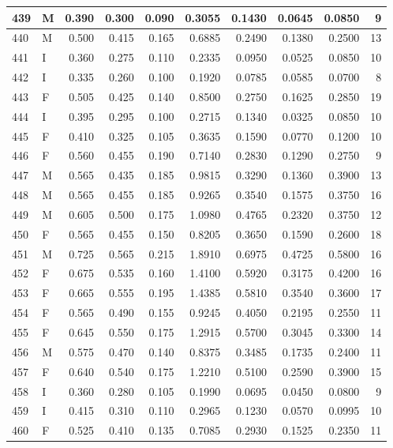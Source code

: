 \documentclass[9pt,twocolumn,twoside,]{pnas-new}
\begin{document}
\begin{tabular}{l|l|r|r|r|r|r|r|r|r}
\hline
439 & M & 0.390 & 0.300 & 0.090 & 0.3055 & 0.1430 & 0.0645 & 0.0850 & 9\\
\hline
440 & M & 0.500 & 0.415 & 0.165 & 0.6885 & 0.2490 & 0.1380 & 0.2500 & 13\\
\hline
441 & I & 0.360 & 0.275 & 0.110 & 0.2335 & 0.0950 & 0.0525 & 0.0850 & 10\\
\hline
442 & I & 0.335 & 0.260 & 0.100 & 0.1920 & 0.0785 & 0.0585 & 0.0700 & 8\\
\hline
443 & F & 0.505 & 0.425 & 0.140 & 0.8500 & 0.2750 & 0.1625 & 0.2850 & 19\\
\hline
444 & I & 0.395 & 0.295 & 0.100 & 0.2715 & 0.1340 & 0.0325 & 0.0850 & 10\\
\hline
445 & F & 0.410 & 0.325 & 0.105 & 0.3635 & 0.1590 & 0.0770 & 0.1200 & 10\\
\hline
446 & F & 0.560 & 0.455 & 0.190 & 0.7140 & 0.2830 & 0.1290 & 0.2750 & 9\\
\hline
447 & M & 0.565 & 0.435 & 0.185 & 0.9815 & 0.3290 & 0.1360 & 0.3900 & 13\\
\hline
448 & M & 0.565 & 0.455 & 0.185 & 0.9265 & 0.3540 & 0.1575 & 0.3750 & 16\\
\hline
449 & M & 0.605 & 0.500 & 0.175 & 1.0980 & 0.4765 & 0.2320 & 0.3750 & 12\\
\hline
450 & F & 0.565 & 0.455 & 0.150 & 0.8205 & 0.3650 & 0.1590 & 0.2600 & 18\\
\hline
451 & M & 0.725 & 0.565 & 0.215 & 1.8910 & 0.6975 & 0.4725 & 0.5800 & 16\\
\hline
452 & F & 0.675 & 0.535 & 0.160 & 1.4100 & 0.5920 & 0.3175 & 0.4200 & 16\\
\hline
453 & F & 0.665 & 0.555 & 0.195 & 1.4385 & 0.5810 & 0.3540 & 0.3600 & 17\\
\hline
454 & F & 0.565 & 0.490 & 0.155 & 0.9245 & 0.4050 & 0.2195 & 0.2550 & 11\\
\hline
455 & F & 0.645 & 0.550 & 0.175 & 1.2915 & 0.5700 & 0.3045 & 0.3300 & 14\\
\hline
456 & M & 0.575 & 0.470 & 0.140 & 0.8375 & 0.3485 & 0.1735 & 0.2400 & 11\\
\hline
457 & F & 0.640 & 0.540 & 0.175 & 1.2210 & 0.5100 & 0.2590 & 0.3900 & 15\\
\hline
458 & I & 0.360 & 0.280 & 0.105 & 0.1990 & 0.0695 & 0.0450 & 0.0800 & 9\\
\hline
459 & I & 0.415 & 0.310 & 0.110 & 0.2965 & 0.1230 & 0.0570 & 0.0995 & 10\\
\hline
460 & F & 0.525 & 0.410 & 0.135 & 0.7085 & 0.2930 & 0.1525 & 0.2350 & 11\\

\end{tabular}
\end{document}
